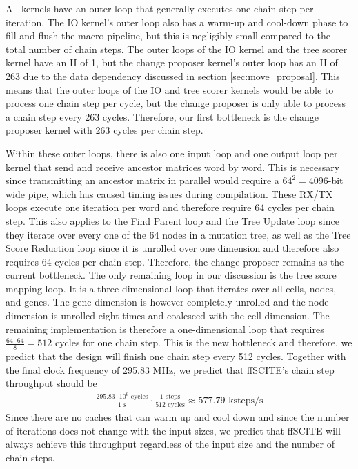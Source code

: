 All kernels have an outer loop that generally executes one chain step per iteration. The IO kernel's outer loop also has a warm-up and cool-down phase to fill and flush the macro-pipeline, but this is negligibly small compared to the total number of chain steps. The outer loops of the IO kernel and the tree scorer kernel have an \ac{II} of 1, but the change proposer kernel's outer loop has an \ac{II} of 263 due to the data dependency discussed in section \ref{sec:move_proposal}. This means that the outer loops of the IO and tree scorer kernels would be able to process one chain step per cycle, but the change proposer is only able to process a chain step every 263 cycles. Therefore, our first bottleneck is the change proposer kernel with 263 cycles per chain step.

Within these outer loops, there is also one input loop and one output loop per kernel that send and receive ancestor matrices word by word. This is necessary since transmitting an ancestor matrix in parallel would require a $64^2 = 4096$-bit wide pipe, which has caused timing issues during compilation. These RX/TX loops execute one iteration per word and therefore require 64 cycles per chain step. This also applies to the Find Parent loop and the Tree Update loop since they iterate over every one of the 64 nodes in a mutation tree, as well as the Tree Score Reduction loop since it is unrolled over one dimension and therefore also requires 64 cycles per chain step. Therefore, the change proposer remains as the current bottleneck. The only remaining loop in our discussion is the tree score mapping loop. It is a three-dimensional loop that iterates over all cells, nodes, and genes. The gene dimension is however completely unrolled and the node dimension is unrolled eight times and coalesced with the cell dimension. The remaining implementation is therefore a one-dimensional loop that requires $\frac{64 \cdot 64}{8} = 512$ cycles for one chain step. This is the new bottleneck and therefore, we predict that the design will finish one chain step every 512 cycles. Together with the final clock frequency of 295.83 MHz, we predict that \ac{ffSCITE}'s chain step throughput should be
\begin{align*}
    \frac{295.83 \cdot 10^6 \text{ cycles}}{1 \text{ s}} \cdot \frac{1 \text{ steps}}{512 \text{ cycles}} \approx 577.79 \text{ ksteps/s} 
\end{align*}
Since there are no caches that can warm up and cool down and since the number of iterations does not change with the input sizes, we predict that \ac{ffSCITE} will always achieve this throughput regardless of the input size and the number of chain steps.